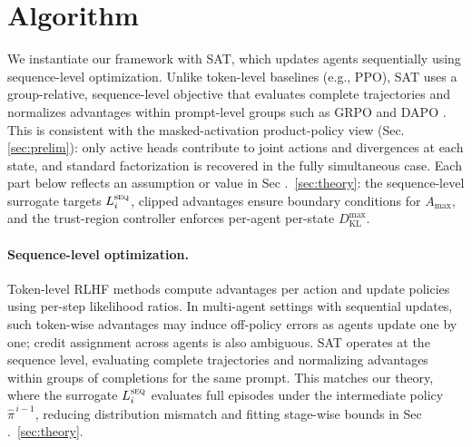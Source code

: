 \documentclass[sigconf]{aamas}
\newcommand{\KL}{D_{\mathrm{KL}}}
\begin{document}
\section{Algorithm}
\label{sec:algorithm}

We instantiate our framework with SAT, which updates agents sequentially using sequence-level optimization. Unlike token-level baselines (e.g., PPO), SAT uses a group-relative, sequence-level objective that evaluates complete trajectories and normalizes advantages within prompt-level groups such as GRPO and DAPO \citep{shao2024deepseekmath,yu2025dapo}. This is consistent with the masked-activation product-policy view (Sec.\ref{sec:prelim}): only active heads contribute to joint actions and divergences at each state, and standard factorization is recovered in the fully simultaneous case. Each part below reflects an assumption or value in Sec .~\ref {sec:theory}: the sequence-level surrogate targets $L_i^{\textsc{seq}}$, clipped advantages ensure boundary conditions for $A_{\max}$, and the trust-region controller enforces per-agent per-state $\KL^{\max}$.

\paragraph{Sequence-level optimization.}
Token-level RLHF methods compute advantages per action and update policies using per-step likelihood ratios. In multi-agent settings with sequential updates, such token-wise advantages may induce off-policy errors as agents update one by one; credit assignment across agents is also ambiguous. SAT operates at the sequence level, evaluating complete trajectories and normalizing advantages within groups of completions for the same prompt. This matches our theory, where the surrogate $L_i^{\textsc{seq}}$ evaluates full episodes under the intermediate policy $\hat{\pi}^{\,i-1}$, reducing distribution mismatch and fitting stage-wise bounds in Sec .~\ref {sec:theory}.
\end{document}
